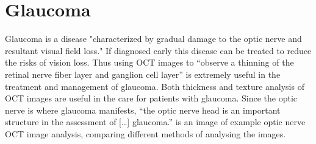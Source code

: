 \section{Glaucoma}
Glaucoma is a disease "characterized by gradual damage to the optic nerve and resultant visual
field loss."\cite{mbib_6} If diagnosed early this disease can be treated to reduce the risks of
vision loss.  Thus using OCT images to “observe a thinning of the retinal nerve fiber layer and
ganglion cell layer” is extremely useful in the treatment and management of glaucoma. \cite{mbib_4}
Both thickness and texture analysis of OCT images are useful in the care for patients with glaucoma.
Since the optic nerve is where glaucoma manifests, “the optic nerve head is an important structure
in the assessment of […] glaucoma.” \cite{mbib_4}   is an image of example optic nerve
OCT image analysis, comparing different methods of analysing the images.

